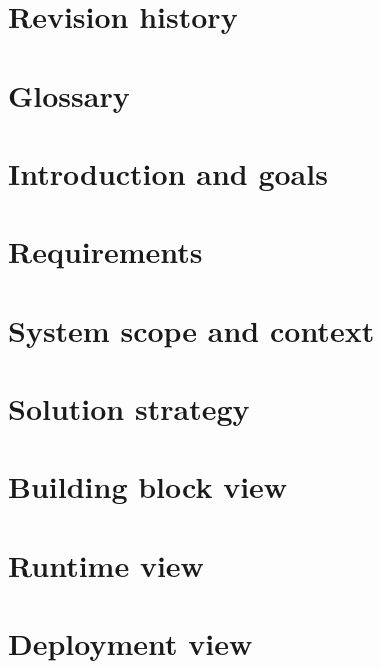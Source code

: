 \documentclass[11pt, oneside]{book}
\begin{document}


\frontmatter

\chapter{Revision history}
\label{chp:rev_his}




\chapter{Glossary}
\label{chp:glos}


\mainmatter

\chapter{Introduction and goals}
\label{chp:intro}


\chapter{Requirements}
\label{chp:requirements}


\chapter{System scope and context}
\label{chp:syst_context}


\chapter{Solution strategy}
\label{chp:sol_strategy}


\chapter{Building block view}
\label{chp:build_block}


\chapter{Runtime view}
\label{chp:runtime}


\chapter{Deployment view}
\label{chp:deployment}

\end{document}
